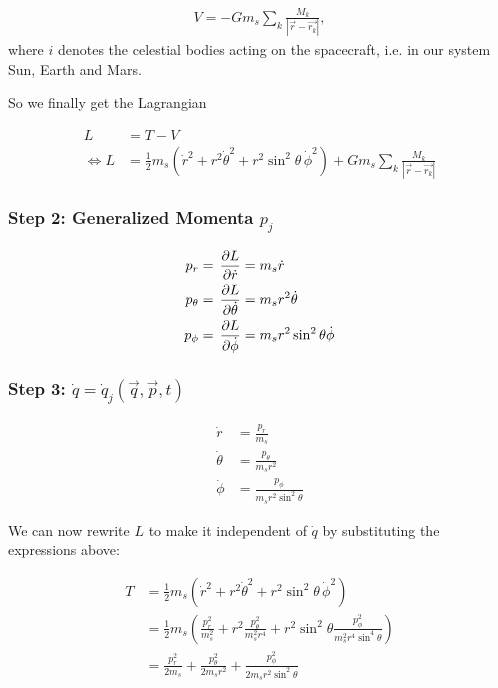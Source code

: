 \begin{align}
    V = -G m_s \sum\limits_{k} \frac{M_k}{\left| \vec{r} - \vec{r_k} \right|},
\end{align}
where \(i\) denotes the celestial bodies acting on the spacecraft, i.e. in our system Sun, Earth and Mars.

So we finally get the Lagrangian

\begin{align}
    L &= T - V \\
    \Leftrightarrow L &= \frac{1}{2} m_s (\dot{r}^2 + r^2\dot{\theta}^2 + r^2\sin^2{\theta}\,\dot{\phi}^2) + G m_s \sum\limits_{k} \frac{M_k}{\left| \vec{r} - \vec{r_k} \right|}
\end{align}

\subsubsection{Step 2: Generalized Momenta \(p_j\)}
\begin{align}
    p_r &= \operatorname{}\frac{\partial L}{\partial \dot{r}} = m_s \dot{r} \label{eq:pr} \\
    p_\theta &= \operatorname{}\frac{\partial L}{\partial \dot{\theta}} = m_s r^2 \dot{\theta} \label{eq:ptheta} \\
    p_\phi &= \operatorname{}\frac{\partial L}{\partial \dot{\phi}} = m_s r^2 \sin^2{\theta} \dot{\phi} \label{eq:pphi}
\end{align}

\subsubsection{Step 3: \(\dot{q} = \dot{q}_j(\vec{q}, \vec{p}, t)\)}
\begin{align}
    \dot{r} &= \frac{p_r}{m_s} \\
    \dot{\theta} &= \frac{p_\theta}{m_s r^2} \\
    \dot{\phi} &= \frac{p_\phi}{m_s r^2 \sin^2{\theta}}
\end{align}

We can now rewrite \(L\) to make it independent of \(\dot{q}\) by substituting the expressions above:

\begin{align}
    T &= \frac{1}{2} m_s (\dot{r}^2 + r^2\dot{\theta}^2 + r^2\sin^2{\theta}\,\dot{\phi}^2) \\
    &= \frac{1}{2} m_s \left(\frac{p_r^2}{m_s^2} + r^2\frac{p_\theta^2}{m_s^2 r^4} + r^2\sin^2{\theta}\frac{p_\phi^2}{m_s^2 r^4 \sin^4{\theta}} \right) \\
    &= \frac{p_r^2}{2 m_s} + \frac{p_\theta^2}{2 m_s r^2} + \frac{p_\phi^2}{2 m_s r^2 \sin^2{\theta}} \\
\end{align}


